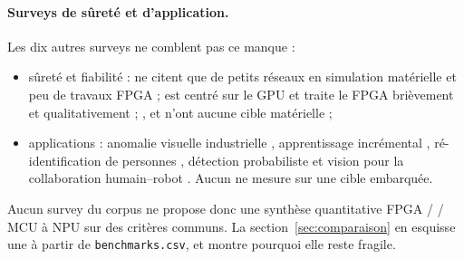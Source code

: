 \paragraph{Surveys de sûreté et d'application.} Les dix autres surveys ne comblent pas ce manque :
\begin{itemize}
  \item sûreté et fiabilité : \citet{2023-ruospo-survey-deep-learning-resilience-assessment}
    ne citent que de petits réseaux en simulation matérielle et peu de travaux FPGA ;
    \citet{2024-rech-artificial-neural-networks-space-safety} est centré sur le GPU et
    traite le FPGA brièvement et qualitativement  ;
    \citet{arxiv-1812.08342-survey-safety-trustworthiness-deep-neural}\pp,
    \citet{2020-schwalbe-survey-methods-safety-assurance-machine} et
    \citet{arxiv-1905.04223-assuring-machine-learning-lifecycle-desiderata}\pp{} n'ont
    aucune cible matérielle ;
  \item applications : anomalie visuelle industrielle
    \citep{2023-cui-survey-unsupervised-anomaly-detection-algorithms}, apprentissage
    incrémental \citep{arxiv-2010.15277-class-incremental-learning-survey-performance}\pp,
    ré-identification de personnes
    \citep{arxiv-2001.04193-deep-learning-person-re-identification}\pp, détection
    probabiliste \citep{arxiv-2011.10671-review-comparative-probabilistic-object-detection}
    et vision pour la collaboration humain--robot
    \citep{2018-halme-review-vision-safety-systems-human}. Aucun ne mesure sur une cible
    embarquée.
\end{itemize}

Aucun survey du corpus ne propose donc une synthèse quantitative FPGA /  / MCU à NPU
sur des critères communs. La section~\ref{sec:comparaison} en esquisse une à partir de
\texttt{benchmarks.csv}, et montre pourquoi elle reste fragile.
